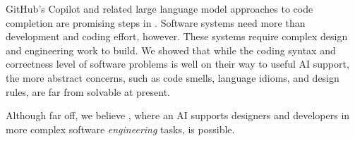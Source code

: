 \label{conclusion}
GitHub's Copilot and related large language model approaches to code completion are promising steps in \AIDE{}. Software systems need more than development and coding effort, however. 
These systems require complex design and engineering work to build. 
We showed that while the coding syntax and correctness level of software problems is well on their way to useful AI support, the more abstract concerns, such as code smells, language idioms, and design rules, are far from solvable at present.

Although far off, we believe \AISE{}, where an AI supports designers and developers in more complex software \emph{engineering} tasks, is possible.
